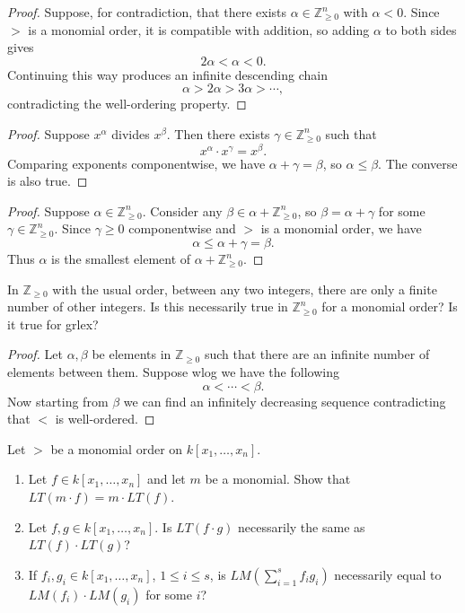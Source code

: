 \begin{proof}
    Suppose, for contradiction, that there exists $\alpha \in \mathbb{Z}_{\ge 0}^n$ with $\alpha < 0$.  
    Since $>$ is a monomial order, it is compatible with addition, so adding $\alpha$ to both sides gives
    \[
    2\alpha < \alpha < 0.
    \]  
    Continuing this way produces an infinite descending chain
    \[
    \alpha > 2\alpha > 3\alpha > \cdots,
    \]
    contradicting the well-ordering property. 
\end{proof}

\begin{proof}
    Suppose $x^\alpha$ divides $x^\beta$. Then there exists $\gamma \in \mathbb{Z}_{\ge 0}^n$ such that
    \[
    x^\alpha \cdot x^\gamma = x^\beta.
    \]  
    Comparing exponents componentwise, we have $\alpha + \gamma = \beta$, so $\alpha \le \beta$.  
    The converse is also true.
\end{proof}

\begin{proof}
    Suppose $\alpha \in \mathbb{Z}_{\ge 0}^n$. Consider any $\beta \in \alpha + \mathbb{Z}_{\ge 0}^n$, so $\beta = \alpha + \gamma$ for some $\gamma \in \mathbb{Z}_{\ge 0}^n$.  
    Since $\gamma \ge 0$ componentwise and $>$ is a monomial order, we have
    \[
    \alpha \le \alpha + \gamma = \beta.
    \]  
    Thus $\alpha$ is the smallest element of $\alpha + \mathbb{Z}_{\ge 0}^n$.
\end{proof}

\begin{tcolorbox}[title=Problem 10, breakable]
    In $\mathbb{Z}_{\ge 0}$ with the usual order, between any two integers,
    there are only a finite number of other integers.
    Is this necessarily true in $\mathbb{Z}_{\ge 0}^n$ for a monomial order? Is it true for grlex?
\end{tcolorbox}

\begin{proof}
    Let $\alpha, \beta$ be elements in $\mathbb{Z}_{\ge 0}$
    such that there are an infinite number of elements between them.
    Suppose wlog we have the following 
    \[\alpha < \cdots < \beta.\]
    Now starting from $\beta$ we can find an infinitely decreasing 
        sequence contradicting that $<$ is well-ordered.
\end{proof}


\begin{tcolorbox}[title=Problem 11, breakable]
    Let $>$ be a monomial order on $k[x_1, \ldots, x_n]$.
    \begin{enumerate}
        \item Let $f \in k[x_1, \ldots, x_n]$ and let $m$ be a monomial. Show that $LT(m \cdot f) = m \cdot LT(f)$.
        \item Let $f, g \in k[x_1, \ldots, x_n]$. Is $LT(f \cdot g)$ necessarily the same as $LT(f) \cdot LT(g)$?
        \item If $f_i, g_i \in k[x_1, \ldots, x_n]$, $1 \le i \le s$, is $LM(\sum_{i=1}^{s} f_i g_i)$ necessarily equal to $LM(f_i) \cdot LM(g_i)$ for some $i$?
    \end{enumerate}
\end{tcolorbox}

